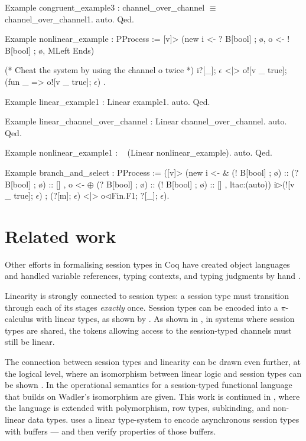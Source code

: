 \documentclass{mproj}
\newcommand{\picalc}{$\pi$-calculus}
\begin{document}
\begin{coq}
Example congruent_example3 : channel_over_channel $\equiv$ channel_over_channel1. auto. Qed.

Example nonlinear_example : PProcess :=
  [v]> (new i <- ? B[bool] ; ø, o <- ! B[bool] ; ø, MLeft Ends)

    (* Cheat the system by using the channel o twice *)
    i?[_]; $\epsilon$ <|> o![v _ true]; (fun _ => o![v _ true]; $\epsilon$)
    .

Example linear_example1 : Linear example1. auto. Qed.

Example linear_channel_over_channel : Linear channel_over_channel. auto. Qed.

Example nonlinear_example1 : ~ (Linear nonlinear_example). auto. Qed.

Example branch_and_select : PProcess :=
  ([v]> (new
           i <- &{ (! B[bool] ; ø) :: (? B[bool] ; ø) :: [] },
           o <- $\oplus${ (? B[bool] ; ø) :: (! B[bool] ; ø) :: [] },
           ltac:(auto))
          i$\triangleright${(![v _ true]; $\epsilon$) ; (?[m]; $\epsilon$)} <|> o$\triangleleft$Fin.F1; ?[_]; $\epsilon$).
\end{coq}

\chapter{Related work}\label{related-work}

Other efforts in formalising session types in Coq have created object languages and handled variable references, typing contexts, and typing judgments by hand \cite{Dilmore2019}.

Linearity is strongly connected to session types: a session type must transition through each of its stages \emph{exactly} once. Session types can be encoded into a \picalc{} with linear types, as shown by \cite{Kobayashi1996,Dardha2012,Dardha2016}. As shown in \cite{Voinea}, in systems where session types are shared, the tokens allowing access to the session-typed channels must still be linear.

The connection between session types and linearity can be drawn even further, at the logical level, where an isomorphism between linear logic and session types can be shown \cite{Caires2010} \cite{Wadler2014}. In \cite{Lindley2015} the operational semantics for a session-typed functional language that builds on Wadler's isomorphism are given. This work is continued in \cite{Lindley}, where the language is extended with polymorphism, row types, subkinding, and non-linear data types. \cite{Gay2010} uses a linear type-system to encode asynchronous session types with buffers --- and then verify properties of those buffers.
\end{document}
